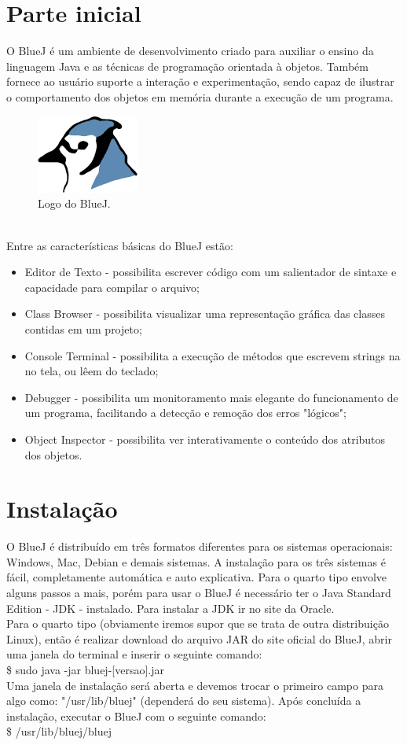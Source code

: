 \documentclass[a4paper,11pt]{article}
\begin{document}
\section{Parte inicial}
O BlueJ é um ambiente de desenvolvimento criado para auxiliar o ensino da linguagem Java e as técnicas de programação orientada à objetos. Também fornece  ao usuário suporte a interação e experimentação, sendo capaz de ilustrar o comportamento dos objetos em memória durante a execução de um programa. 
\begin{figure}[!htb]
	\centering
	\includegraphics[width=0.3\textwidth]{bluej.png}
	\caption{Logo do BlueJ.}
\end{figure} \\[2mm]
Entre as características básicas do BlueJ estão:
\begin{itemize}
	\item Editor de Texto - possibilita escrever código com um salientador de sintaxe e capacidade para compilar o arquivo; 
	\item Class Browser - possibilita visualizar uma representação gráfica das classes contidas em um projeto;
	\item Console Terminal - possibilita a execução de métodos que escrevem strings na no tela, ou lêem do teclado;
	\item Debugger - possibilita um monitoramento mais elegante do funcionamento de um programa, facilitando a detecção e remoção dos erros "lógicos";
	\item Object Inspector -  possibilita ver interativamente o conteúdo dos atributos dos objetos.
\end{itemize}

\section{Instalação}
O BlueJ é distribuído em três formatos diferentes para os sistemas operacionais: Windows, Mac, Debian e demais sistemas. A instalação para os três sistemas é fácil, completamente automática e auto explicativa. Para o quarto tipo envolve alguns passos a mais, porém para usar o BlueJ é necessário ter o Java Standard Edition - JDK - instalado. Para instalar a JDK ir no site da Oracle\cite{oracleoficial}. \\[2mm]
Para o quarto tipo (obviamente iremos supor que se trata de outra distribuição Linux), então é realizar download do arquivo JAR do site oficial do BlueJ, abrir uma janela do terminal e inserir o seguinte comando: \\
{\ttfamily\$ sudo java -jar bluej-[versao].jar} \\[2mm]
Uma janela de instalação será aberta e devemos trocar o primeiro campo para algo como: "/usr/lib/bluej" (dependerá do seu sistema). Após concluída a instalação, executar o BlueJ com o seguinte comando: \\
{\ttfamily\$ /usr/lib/bluej/bluej}
\end{document}
